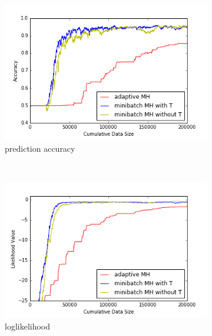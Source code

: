 \documentclass{article}
\begin{document}
\begin{figure}
    \centering
    \begin{subfigure}[b]{0.32\textwidth}
        \includegraphics[width=\textwidth]{./figures/acc_hyc.png}
        \caption{prediction accuracy}
        \label{fig:logistic_pa}
    \end{subfigure}
    ~ %
    \begin{subfigure}[b]{0.32\textwidth}
        \includegraphics[width=\textwidth]{./figures/ll_hyc.png}
        \caption{loglikelihood}
        \label{fig:logistic_ll}
    \end{subfigure}
    ~ %
    \begin{subfigure}[b]{0.32\textwidth}

\end{subfigure}
\end{figure}
\end{document}
